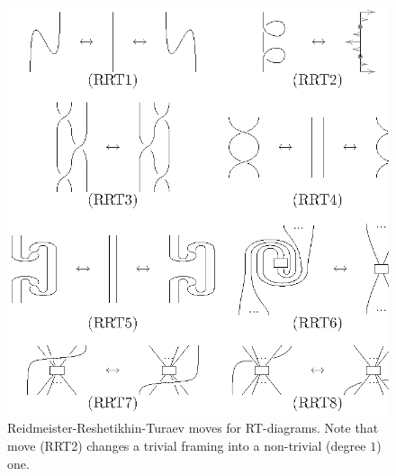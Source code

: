 \begin{figure}[p]
  \centering\includegraphics{fig-003}
  \caption{Reidmeister-Reshetikhin-Turaev moves for
    RT-diagrams. Note that move (RRT2) changes a trivial framing
    into a non-trivial (degree $1$) one.}
  \label{fig:gc-rrt}
\end{figure}

